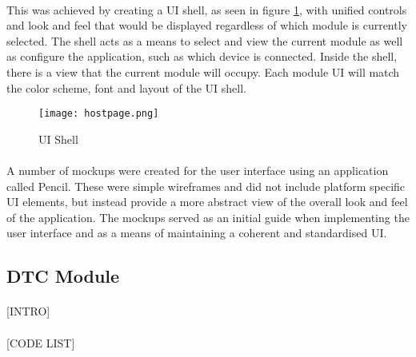 	\paragraph{}{
	This was achieved by creating a UI shell, as seen in figure \ref{fig:UIShell}, with unified controls and look and feel that would be displayed regardless of which module is currently selected. The shell acts as a means to select and view the current module as well as configure the application, such as which device is connected. Inside the shell, there is a view that the current module will occupy. Each module UI will match the color scheme, font and layout of the UI shell.
	}
	
	\begin{figure}[h]
		\begin{center}
			\texttt{[image: hostpage.png]}
			\caption{UI Shell}
			\label{fig:UIShell}
		\end{center}
	\end{figure}	
	
	\paragraph{}{
	A number of mockups were created for the user interface using an application called Pencil. These were simple wireframes and did not include platform specific UI elements, but instead provide a more abstract view of the overall look and feel of the application. The mockups served as an initial guide when implementing the user interface and as a means of maintaining a coherent and standardised UI. 
	}
	
	\subsection{DTC Module}
		\paragraph{}{						
		[INTRO]
		}
		\paragraph{}{
		[CODE LIST]
		}
